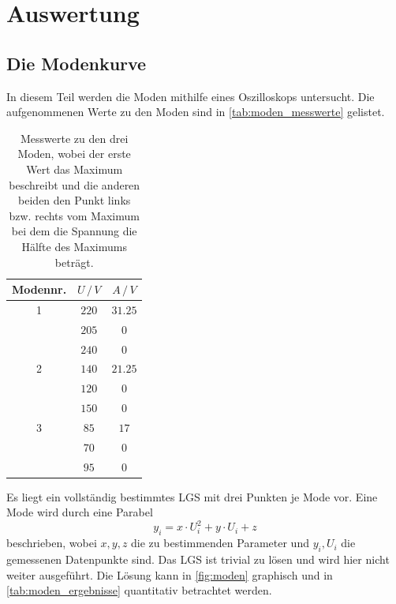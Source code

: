\section{Auswertung}
\label{sec:Auswertung}

\subsection{Die Modenkurve}
\label{sec:ausw_moden}
In diesem Teil werden die Moden mithilfe eines Oszilloskops untersucht.
Die aufgenommenen Werte zu den Moden sind in \autoref{tab:moden_messwerte} gelistet.
\begin{table}
    \centering
    \caption{Messwerte zu den drei Moden, wobei der erste Wert das Maximum beschreibt und die anderen beiden den Punkt links bzw. rechts vom Maximum bei dem die Spannung die Hälfte des Maximums beträgt.}
    \begin{tabular}{c c c}
        \toprule
        Modennr. & $U \,/\, V$ & $A \,/\, V$ \\
        \midrule
        1 & $220$ & $31.25$ \\
        & $205$ & $0$ \\
        & $240$ & $0$ \\
        \hline
        2 & $140$ & $21.25$ \\
        & $120$ & $0$ \\
        & $150$ & $0$ \\
        \hline
        3 & $85$ & $17$ \\
        & $70$ & $0$ \\
        & $95$ & $0$ \\
        \bottomrule
    \end{tabular}
    \label{tab:moden_messwerte}
\end{table}
\FloatBarrier
Es liegt ein vollständig bestimmtes LGS mit drei Punkten je Mode vor.
Eine Mode wird durch eine Parabel
\begin{equation*}
    y_i = x \cdot U_i^2 + y \cdot U_i + z
\end{equation*}
beschrieben, wobei $x, y, z$ die zu bestimmenden Parameter und $y_i, U_i$ die gemessenen Datenpunkte sind.
Das LGS ist trivial zu lösen und wird hier nicht weiter ausgeführt.
Die Lösung kann in \autoref{fig:moden} graphisch und in \autoref{tab:moden_ergebnisse} quantitativ betrachtet werden.
